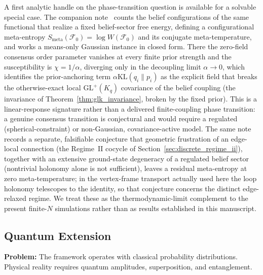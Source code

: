 \documentclass[11pt]{article}
\begin{document}
A first analytic handle on the phase-transition question is available for a solvable special case. The companion note~\cite{Dennis2026metaentropy} counts the belief configurations of the same functional that realize a fixed belief-sector free energy, defining a configurational meta-entropy $S_{\mathrm{meta}}(\mathcal{F}_0) = \log W(\mathcal{F}_0)$ and its conjugate meta-temperature, and works a means-only Gaussian instance in closed form. There the zero-field consensus order parameter vanishes at every finite prior strength and the susceptibility is $\chi = 1/\alpha$, diverging only in the decoupling limit $\alpha \to 0$, which identifies the prior-anchoring term $\alpha \mathrm{KL}(q_i\|p_i)$ as the explicit field that breaks the otherwise-exact local $\mathrm{GL}^+(K_q)$ covariance of the belief coupling (the invariance of Theorem~\ref{thm:glk_invariance}, broken by the fixed prior). This is a linear-response signature rather than a delivered finite-coupling phase transition: a genuine consensus transition is conjectural and would require a regulated (spherical-constraint) or non-Gaussian, covariance-active model. The same note records a separate, falsifiable conjecture that geometric frustration of an edge-local connection (the Regime~II cocycle of Section~\ref{sec:discrete_regime_ii}), together with an extensive ground-state degeneracy of a regulated belief sector (nontrivial holonomy alone is not sufficient), leaves a residual meta-entropy at zero meta-temperature; in the vertex-frame transport actually used here the loop holonomy telescopes to the identity, so that conjecture concerns the distinct edge-relaxed regime. We treat these as the thermodynamic-limit complement to the present finite-$N$ simulations rather than as results established in this manuscript.

\subsection{Quantum Extension}

\textbf{Problem:} The framework operates with classical probability distributions. Physical reality requires quantum amplitudes, superposition, and entanglement.
\end{document}
